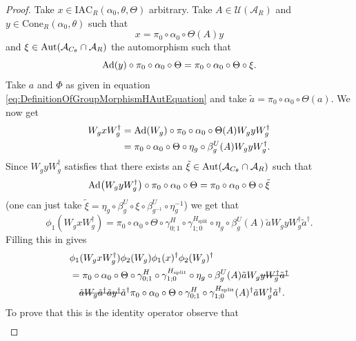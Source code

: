 \documentclass[12pt,a4paper,twoside]{article}
\newcommand{\stkout}[1]{\ifmmode\text{\sout{\ensuremath{#1}}}\else\sout{#1}\fi}
\newcommand{\IAC}{\textrm{IAC}}
\let\originalleft\left
\let\originalright\right
\renewcommand{\left}{\mathopen{}\mathclose\bgroup\originalleft}
\renewcommand{\right}{\aftergroup\egroup\originalright}
\newcommand{\UU}{\mathcal U}
\renewcommand{\AA}{\mathcal A}
\newcommand{\Ad}[1]{\textrm{Ad}\left(#1\right)}
\newcommand{\Aut}[1]{\textrm{Aut}\left(#1\right)}
\theoremstyle{definition}
\numberwithin{equation}{section}
\begin{document}
\begin{proof}
	Take $x\in \IAC_R(\alpha_0,\theta,\Theta)$ arbitrary. Take $A\in\UU(\AA_R)$ and $y\in\text{Cone}_R(\alpha_0,\theta)$ such that
	\begin{equation}
		x=\pi_0\circ\alpha_0\circ\Theta(A)y
	\end{equation}
	and $\xi\in\Aut{\AA_{C_\theta}\cap \AA_R}$ the automorphism such that
	\begin{equation}
		\Ad{y}\circ\pi_0\circ\alpha_0\circ\Theta=\pi_0\circ\alpha_0\circ\Theta\circ\xi.
	\end{equation}
	Take $a$ and $\Phi$ as given in equation \eqref{eq:DefinitionOfGroupMorphismHAutEquation} and take $\tilde{a}=\pi_0\circ\alpha_0\circ\Theta(a)$. We now get
	\begin{align}
		W_g x W_g^\dagger&=\Ad{W_g}\circ\pi_0\circ\alpha_0\circ\Theta(A) W_gyW_g^\dagger\\
		&=\pi_0\circ\alpha_0\circ\Theta\circ\eta_g\circ\beta_g^U(A) W_gyW_g^\dagger.
	\end{align}
	Since $W_g yW_g^\dagger$ satisfies that there exists an $\tilde{\xi}\in\Aut{\AA_{C_\theta}\cap \AA_R}$ such that
	\begin{equation}
		\Ad{W_gyW_g^\dagger}\circ \pi_0\circ\alpha_0\circ\Theta=\pi_0\circ\alpha_0\circ\Theta\circ\tilde\xi
	\end{equation}
	(one can just take $\tilde\xi=\eta_g\circ\beta_g^U\circ\xi\circ\beta_{g^{-1}}^U\circ\eta_g^{-1}$) we get that
	\begin{equation}
		\phi_1(W_gxW_g^{\dagger})=\pi_0\circ\alpha_0\circ\Theta\circ\gamma^{H}_{0;1}\circ\gamma^{H_\text{split}}_{1;0}\circ\eta_g\circ\beta_g^U(A)\tilde{a}W_gyW_g^\dagger\tilde{a}^\dagger.
	\end{equation}
	Filling this in gives
	\begin{align}
		&\phi_1(W_gxW_g^\dagger)\phi_2(W_g)\phi_1(x)^\dagger\phi_2(W_g)^\dagger\\
		\label{eq:phi1phi2matchingConditionEquation}
		&=\pi_0\circ\alpha_0\circ\Theta\circ\gamma^{H}_{0;1}\circ\gamma^{H_\text{split}}_{1;0}\circ\eta_g\circ\beta_g^U(A)\tilde{a}W_g\stkout{yW_g^\dagger\tilde{a}^\dagger}\\
		\nonumber
		&\quad\stkout{\tilde{a}W_g\tilde{a}^\dagger\tilde{a}y^\dagger}\tilde{a}^\dagger\pi_0\circ\alpha_0\circ\Theta\circ\gamma^{H}_{0;1}\circ\gamma^{H_\text{split}}_{1;0}(A)^\dagger\tilde{a}W_g^\dagger\tilde{a}^\dagger.
	\end{align}
	To prove that this is the identity operator observe that
	\begin{align}

\end{align}
\end{proof}
\end{document}
